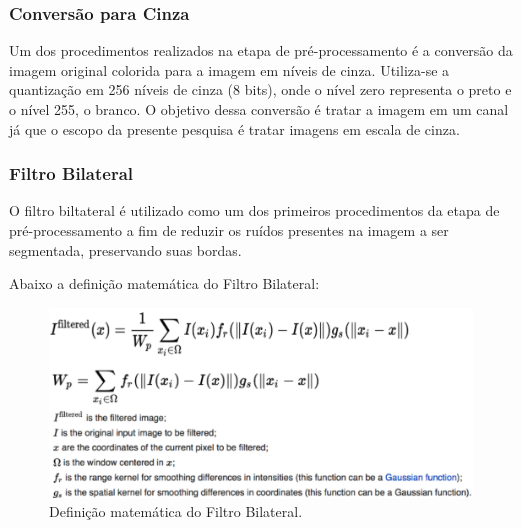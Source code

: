 \subsubsection{Conversão para Cinza}
Um dos procedimentos realizados na etapa de pré-processamento é a conversão da imagem original colorida para a imagem em níveis de cinza. Utiliza-se a quantização em 256 níveis de cinza (8 bits), onde o nível zero representa o preto e o nível 255, o branco.
O objetivo dessa conversão é tratar a imagem em um canal já que o escopo da presente pesquisa é tratar imagens em escala de cinza.

\subsubsection{Filtro Bilateral}
O filtro biltateral é utilizado como um dos primeiros procedimentos da etapa de pré-processamento a fim de reduzir os ruídos presentes na imagem a ser segmentada, preservando suas bordas.

Abaixo a definição matemática do Filtro Bilateral:

	\begin{figure}[!htb]
       \begin{center}  
          \includegraphics[width=0.7\columnwidth]{img/definicao_matematica_filtro_bilateral.jpg}
           \caption{\label{fig:definicao_matematica_filtro_bilateral}Definição matemática do Filtro Bilateral.}
       \end{center}
   \end{figure}
   

